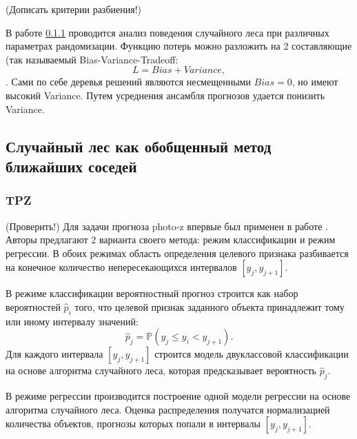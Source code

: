 \documentclass[fleqn,usenatbib]{mnras}
\begin{document}
(Дописать критерии разбиения!)

В работе \ref{} проводится анализ поведения случайного леса при различных параметрах рандомизации. Функцию потерь можно разложить на 2 составляющие (так называемый Bias-Variance-Tradeoff:
\begin{equation}\label{eq:bias-variance-tradeoff}
    L = Bias + Variance,
\end{equation}.
Сами по себе деревья решений являются несмещенными $Bias = 0$, но имеют высокий Variance. Путем усреднения ансамбля прогнозов удается понизить Variance.

\subsection{Случайный лес как обобщенный метод ближайших соседей}

\subsubsection{TPZ}
(Проверить!) Для задачи прогноза photo-z впервые был применен в работе \cite{bib:tpz}. Авторы предлагают 2 варианта своего метода: режим классификации и режим регрессии. В обоих режимах область определения целевого признака разбивается на конечное количество непересекающихся интервалов $[y_j, y_{j+1}]$.

В режиме классификации вероятностный прогноз строится как набор вероятностей $\hat{p}_i$ того, что целевой признак заданного объекта принадлежит тому или иному интервалу значений:
\begin{equation}
    \hat{p}_j = \mathbb{P}(y_j \leq y_i < y_{j+1}).
\end{equation}
Для каждого интервала $[y_j, y_{j+1}]$ строится модель двуклассовой классификации на основе алгоритма случайного леса, которая предсказывает вероятность $\hat{p}_j$.

В режиме регрессии производится построение одной модели регрессии на основе алгоритма случайного леса. Оценка распределения получатся нормализацией количества объектов, прогнозы которых попали в интервалы $[y_j, y_{j+1}]$.
\end{document}
